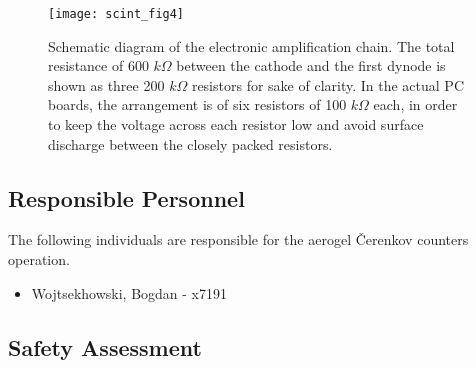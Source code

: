 %
%
\begin{figure}[p]
\texttt{[image: scint\_fig4]}
\caption[Aerogel: amplification chain]{
 Schematic diagram of the electronic amplification chain. The total 
 resistance of 600 $k\Omega$ between the cathode and the first dynode is shown 
 as three 200 $k\Omega$ resistors for sake of clarity. In the actual PC boards, 
 the arrangement is of six resistors of 100 $k\Omega$ each, in order to 
 keep the voltage across each resistor low and avoid surface discharge 
 between the closely packed resistors.
 }
\label{fig:aero_fig7}
\end{figure}

\subsection{Responsible Personnel} 
The following individuals are responsible for the aerogel \v{C}erenkov counters 
operation. 
\begin{itemize}
\item[~]Wojtsekhowski, Bogdan - x7191 
\end{itemize} 
 
\subsection{Safety Assessment}

